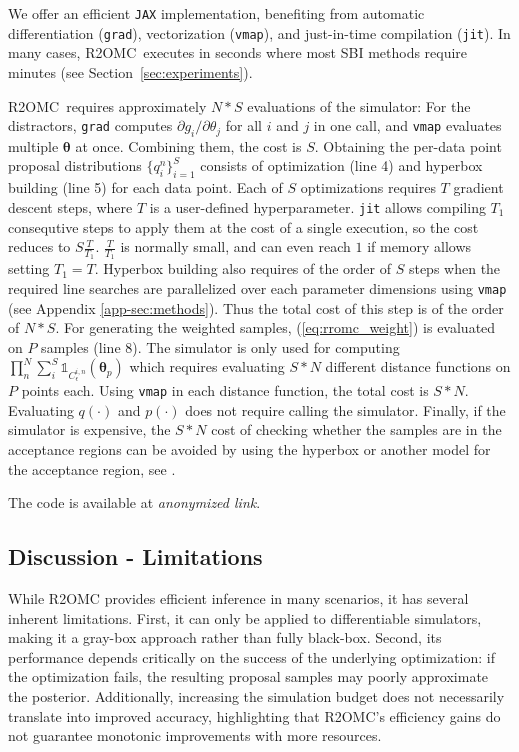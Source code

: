 \documentclass[twoside]{article}
\newcommand{\thb}{\boldsymbol{\theta}}
\newcommand{\rromc}{R2OMC}
\newcommand{\LinkToCode}{\textit{anonymized link}}
\begin{document}
We offer an efficient \texttt{JAX} implementation, benefiting from automatic differentiation (\texttt{grad}), vectorization (\texttt{vmap}), and just-in-time compilation (\texttt{jit}). 
In many cases, \rromc~executes in seconds where most SBI methods require minutes (see Section~\ref{sec:experiments}). 

\rromc~requires approximately $N * S$ evaluations of the simulator: For the distractors, \texttt{grad} computes $\partial g_i/\partial \theta_j$ for all $i$ and $j$ in one call, and \texttt{vmap} evaluates multiple $\thb$ at once.
Combining them, the cost is $S$. Obtaining the per-data point proposal distributions $\{q_i^n\}_{i=1}^S$ consists of optimization (line 4) and hyperbox building (line 5) for each data point. Each of $S$ optimizations requires $T$ gradient descent steps, where $T$ is a user-defined hyperparameter. \texttt{jit} allows compiling $T_1$ consequtive steps to apply them at the cost of a single execution, so the cost reduces to $S \frac{T}{T_1}$. $\frac{T}{T_1}$ is normally small, and can even reach $1$ if memory allows setting $T_1 = T$. Hyperbox building also requires of the order of $S$ steps when the required line searches are parallelized over each parameter dimensions using \texttt{vmap} (see Appendix \ref{app-sec:methods}). Thus the total cost of this step is of the order of $N*S$. For generating the weighted samples, (\ref{eq:rromc_weight}) is evaluated on $P$ samples (line 8).
The simulator is only used for computing $\prod_n^N \sum_i^S \mathbb{1}_{C_{\epsilon}^{i,n}}(\thb_p)$ which requires evaluating $S * N$ different distance functions on $P$ points each. Using \texttt{vmap} in each distance function, the total cost is $S * N$. Evaluating $q(\cdot)$ and $p(\cdot)$ does not require calling the simulator. Finally, if the simulator is expensive, the $S *N$ cost of checking whether the samples are in the acceptance regions can be avoided by using the hyperbox or another model for the acceptance region, see \citet{ikonomov2020robust}. 

The code is available at \LinkToCode.

\subsection{Discussion - Limitations}

While R2OMC provides efficient inference in many scenarios, it has several inherent limitations. First, it can only be applied to differentiable simulators, making it a gray-box approach rather than fully black-box. Second, its performance depends critically on the success of the underlying optimization: if the optimization fails, the resulting proposal samples may poorly approximate the posterior. Additionally, increasing the simulation budget does not necessarily translate into improved accuracy, highlighting that R2OMC’s efficiency gains do not guarantee monotonic improvements with more resources.
\end{document}
